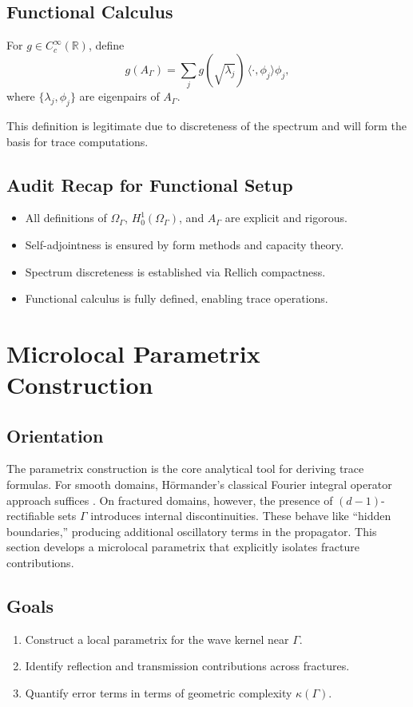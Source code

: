 \subsection*{Functional Calculus}
\begin{definition}
For $g \in C_c^\infty(\mathbb{R})$, define
\[
g(A_\Gamma) = \sum_{j} g(\sqrt{\lambda_j}) \, \langle \cdot, \phi_j \rangle
\phi_j,
\]
where $\{\lambda_j, \phi_j\}$ are eigenpairs of $A_\Gamma$.
\end{definition}

This definition is legitimate due to discreteness of the spectrum and will
form the basis for trace computations.

\subsection*{Audit Recap for Functional Setup}
\begin{itemize}
  \item All definitions of $\Omega_\Gamma$, $H^1_0(\Omega_\Gamma)$, and
  $A_\Gamma$ are explicit and rigorous.
  \item Self-adjointness is ensured by form methods and capacity theory.
  \item Spectrum discreteness is established via Rellich compactness.
  \item Functional calculus is fully defined, enabling trace operations.
\end{itemize}

\section*{Microlocal Parametrix Construction}
\label{sec:microlocal-parametrix}

\subsection*{Orientation}
The parametrix construction is the core analytical tool for deriving trace
formulas. For smooth domains, Hörmander's classical Fourier integral operator
approach suffices \cite{Hormander1971}. On fractured domains, however, the
presence of $(d-1)$-rectifiable sets $\Gamma$ introduces internal
discontinuities. These behave like ``hidden boundaries,'' producing additional
oscillatory terms in the propagator. This section develops a microlocal
parametrix that explicitly isolates fracture contributions.

\subsection*{Goals}
\begin{enumerate}[label=G\arabic*]
  \item Construct a local parametrix for the wave kernel near $\Gamma$.
  \item Identify reflection and transmission contributions across fractures.
  \item Quantify error terms in terms of geometric complexity $\kappa(\Gamma)$.
\end{enumerate}

